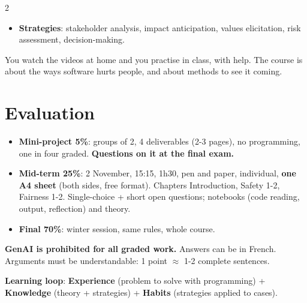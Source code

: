 \documentclass[a4paper,9pt]{extarticle}
\begin{document}
\begin{multicols}{2}
\begin{itemize}
\item \textbf{Strategies}: stakeholder analysis, impact anticipation, values elicitation, risk
assessment, decision-making.

\end{itemize}


\begin{goat}

You watch the videos at home and you practise in class, with help. The course is about the
ways software hurts people, and about methods to see it coming.

\end{goat}



\section{Evaluation}


\begin{important}

\begin{itemize}

\item \textbf{Mini-project 5\%}: groups of 2, 4 deliverables (2-3 pages), no programming,
one in four graded. \textbf{Questions on it at the final exam.}

\item \textbf{Mid-term 25\%}: 2 November, 15:15, 1h30, pen and paper, individual,
\textbf{one A4 sheet} (both sides, free format). Chapters Introduction, Safety 1-2, Fairness
1-2. Single-choice + short open questions; notebooks (code reading, output, reflection) and
theory.

\item \textbf{Final 70\%}: winter session, same rules, whole course.

\end{itemize}

\end{important}


\begin{warning}

\textbf{GenAI is prohibited for all graded work.} Answers can be in French. Arguments must be
understandable: 1 point $\approx$ 1-2 complete sentences.

\end{warning}


\textbf{Learning loop}: \textbf{Experience} (problem to solve with programming) +
\textbf{Knowledge} (theory + strategies) + \textbf{Habits} (strategies applied to cases).



\end{multicols}
\end{document}
